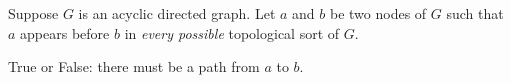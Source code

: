 \begin{prob}
    Suppose $G$ is an acyclic directed graph. Let $a$ and $b$ be two nodes of
    $G$ such that $a$ appears before $b$ in \emph{every possible} topological
    sort of $G$.

    True or False: there must be a path from $a$ to $b$.

    \Tf{}
\end{prob}
